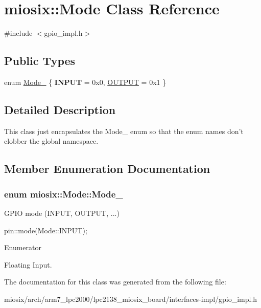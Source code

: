 \hypertarget{classmiosix_1_1_mode}{\section{miosix\-:\-:Mode Class Reference}
\label{classmiosix_1_1_mode}
}


{\ttfamily \#include $<$gpio\-\_\-impl.\-h$>$}

\subsection*{Public Types}
\begin{DoxyCompactItemize}
\item 
enum \hyperlink{classmiosix_1_1_mode_a481b1664f08bbe862f80be59ab0ffcf9}{Mode\-\_\-} \{ {\bfseries I\-N\-P\-U\-T} = 0x0, 
\hyperlink{classmiosix_1_1_mode_a481b1664f08bbe862f80be59ab0ffcf9ae0bbb74d2f8cb3136ff00befbd6c8b5f}{O\-U\-T\-P\-U\-T} = 0x1
 \}
\end{DoxyCompactItemize}


\subsection{Detailed Description}
This class just encapsulates the Mode\-\_\- enum so that the enum names don't clobber the global namespace. 

\subsection{Member Enumeration Documentation}
\hypertarget{classmiosix_1_1_mode_a481b1664f08bbe862f80be59ab0ffcf9}{
\subsubsection[{Mode\-\_\-}]{\setlength{\rightskip}{0pt plus 5cm}enum {\bf miosix\-::\-Mode\-::\-Mode\-\_\-}}}\label{classmiosix_1_1_mode_a481b1664f08bbe862f80be59ab0ffcf9}
G\-P\-I\-O mode (I\-N\-P\-U\-T, O\-U\-T\-P\-U\-T, ...) 
\begin{DoxyCode}
pin::mode(Mode::INPUT); 
\end{DoxyCode}
 \begin{Desc}
\item[Enumerator]\par
\begin{description}
\item[{\em 
\hypertarget{classmiosix_1_1_mode_a481b1664f08bbe862f80be59ab0ffcf9ae0bbb74d2f8cb3136ff00befbd6c8b5f}{O\-U\-T\-P\-U\-T}\label{classmiosix_1_1_mode_a481b1664f08bbe862f80be59ab0ffcf9ae0bbb74d2f8cb3136ff00befbd6c8b5f}
}]Floating Input. \end{description}
\end{Desc}


The documentation for this class was generated from the following file\-:\begin{DoxyCompactItemize}
\item 
miosix/arch/arm7\-\_\-lpc2000/lpc2138\-\_\-miosix\-\_\-board/interfaces-\/impl/gpio\-\_\-impl.\-h\end{DoxyCompactItemize}
